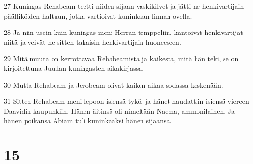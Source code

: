 \par 27 Kuningas Rehabeam teetti niiden sijaan vaskikilvet ja jätti ne henkivartijain päälliköiden haltuun, jotka vartioivat kuninkaan linnan ovella.
\par 28 Ja niin usein kuin kuningas meni Herran temppeliin, kantoivat henkivartijat niitä ja veivät ne sitten takaisin henkivartijain huoneeseen.
\par 29 Mitä muuta on kerrottavaa Rehabeamista ja kaikesta, mitä hän teki, se on kirjoitettuna Juudan kuningasten aikakirjassa.
\par 30 Mutta Rehabeam ja Jerobeam olivat kaiken aikaa sodassa keskenään.
\par 31 Sitten Rehabeam meni lepoon isiensä tykö, ja hänet haudattiin isiensä viereen Daavidin kaupunkiin. Hänen äitinsä oli nimeltään Naema, ammonilainen. Ja hänen poikansa Abiam tuli kuninkaaksi hänen sijaansa.

\chapter{15}

